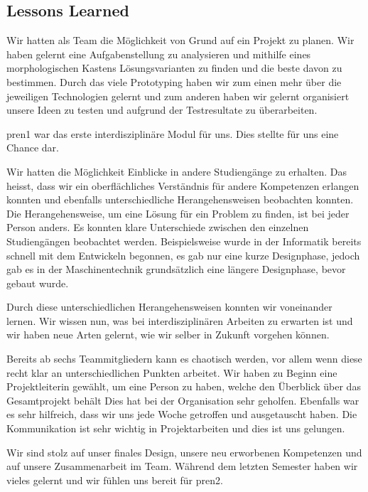 \subsection{Lessons Learned}

Wir hatten als Team die Möglichkeit von Grund auf ein Projekt zu planen. Wir haben gelernt eine Aufgabenstellung zu analysieren und mithilfe eines morphologischen Kastens Lösungsvarianten zu finden und die beste davon zu bestimmen. Durch das viele Prototyping haben wir zum einen mehr über die jeweiligen Technologien gelernt und zum anderen haben wir gelernt organisiert unsere Ideen zu testen und aufgrund der Testresultate zu überarbeiten.

\acrshort{pren1} war das erste interdisziplinäre Modul für uns. Dies stellte für uns eine Chance dar.

Wir hatten die Möglichkeit Einblicke in andere Studiengänge zu erhalten. Das heisst, dass wir ein oberflächliches Verständnis für andere Kompetenzen erlangen konnten und ebenfalls unterschiedliche Herangehensweisen beobachten konnten.
Die Herangehensweise, um eine Lösung für ein Problem zu finden, ist bei jeder Person anders. Es konnten klare Unterschiede zwischen den einzelnen Studiengängen beobachtet werden.
Beispielsweise wurde in der Informatik bereits schnell mit dem Entwickeln begonnen, es gab nur eine kurze Designphase, jedoch gab es in der Maschinentechnik grundsätzlich eine längere Designphase, bevor gebaut wurde.

Durch diese unterschiedlichen Herangehensweisen konnten wir voneinander lernen.
Wir wissen nun, was bei interdisziplinären Arbeiten zu erwarten ist und wir haben neue Arten gelernt, wie wir selber in Zukunft vorgehen können.

Bereits ab sechs Teammitgliedern kann es chaotisch werden, vor allem wenn diese recht klar an unterschiedlichen Punkten arbeitet.
Wir haben zu Beginn eine Projektleiterin gewählt, um eine Person zu haben, welche den Überblick über das Gesamtprojekt behält
Dies hat bei der Organisation sehr geholfen. Ebenfalls war es sehr hilfreich, dass wir uns jede Woche getroffen und ausgetauscht haben. Die Kommunikation ist sehr wichtig in Projektarbeiten und dies ist uns gelungen.

Wir sind stolz auf unser finales Design, unsere neu erworbenen Kompetenzen und auf unsere Zusammenarbeit im Team. Während dem letzten Semester haben wir vieles gelernt und wir fühlen uns bereit für \acrshort{pren2}.



